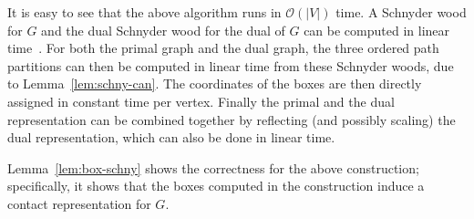 \documentclass{article}
\newcommand{\Oh}{{\ensuremath{\mathcal{O}}}}
\begin{document}
It is easy to see that the above algorithm runs in $\Oh(|V|)$ time. A Schnyder wood for $G$ and the dual Schnyder wood
 for the dual of $G$ can be computed in linear time~\cite{FZ08}. For both the primal graph and the dual
 graph, the three ordered path partitions can then be computed in linear time from these Schnyder woods,
 due to Lemma~\ref{lem:schny-can}. The coordinates of the boxes are then directly assigned in constant
 time per vertex. Finally the primal and the dual representation can be combined together by reflecting
 (and possibly scaling) the dual representation, which can also be done in linear time.


Lemma~\ref{lem:box-schny} shows the correctness
for the above construction; specifically,
 it shows that the boxes computed in the construction induce a contact representation for $G$.
\end{document}
